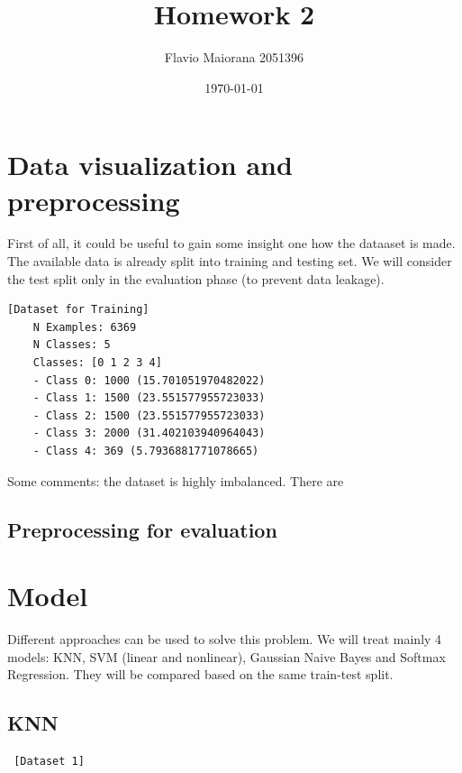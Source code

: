 \documentclass[12pt,a4paper,oneside]{article}
\title{Homework 2}	                                    %
\author{Flavio Maiorana 2051396}				        %
\date{\today}								            %
\begin{document}

\newpage


\section{Data visualization and preprocessing}

First of all, it could be useful to gain some insight one how the dataaset is
made. The available data is already split into training and testing set. We
will consider the test split only in the evaluation phase (to prevent
data leakage).

\begin{verbatim}[Dataset for Training]
    N Examples: 6369
    N Classes: 5
    Classes: [0 1 2 3 4]
    - Class 0: 1000 (15.701051970482022)
    - Class 1: 1500 (23.551577955723033)
    - Class 2: 1500 (23.551577955723033)
    - Class 3: 2000 (31.402103940964043)
    - Class 4: 369 (5.7936881771078665)
\end{verbatim}

Some comments: the dataset is highly imbalanced. There are 

\newpage

\subsection{Preprocessing for evaluation}



\section{Model}

Different approaches can be used to solve this problem. We will treat mainly 4
models: KNN, SVM (linear and nonlinear), Gaussian Naive Bayes and Softmax
Regression. They will be compared based on the same train-test split.

\subsection{KNN}

\begin{verbatim} [Dataset 1]
\end{verbatim}
\end{document}
